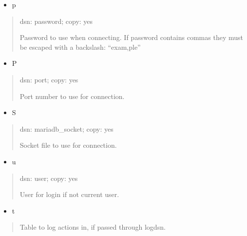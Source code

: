 \documentclass[letterpaper,10pt,english]{sphinxmanual}
\begin{document}
\begin{itemize}
\item {} 
\sphinxAtStartPar
p

\end{itemize}
\begin{quote}

\sphinxAtStartPar
dsn: password; copy: yes

\sphinxAtStartPar
Password to use when connecting.
If password contains commas they must be escaped with a backslash: “exam,ple”
\end{quote}
\begin{itemize}
\item {} 
\sphinxAtStartPar
P

\end{itemize}
\begin{quote}

\sphinxAtStartPar
dsn: port; copy: yes

\sphinxAtStartPar
Port number to use for connection.
\end{quote}
\begin{itemize}
\item {} 
\sphinxAtStartPar
S

\end{itemize}
\begin{quote}

\sphinxAtStartPar
dsn: mariadb\_socket; copy: yes

\sphinxAtStartPar
Socket file to use for connection.
\end{quote}
\begin{itemize}
\item {} 
\sphinxAtStartPar
u

\end{itemize}
\begin{quote}

\sphinxAtStartPar
dsn: user; copy: yes

\sphinxAtStartPar
User for login if not current user.
\end{quote}
\begin{itemize}
\item {} 
\sphinxAtStartPar
t

\end{itemize}
\begin{quote}

\sphinxAtStartPar
Table to log actions in, if passed through \textendash{}log\sphinxhyphen{}dsn.
\end{quote}
\end{document}
